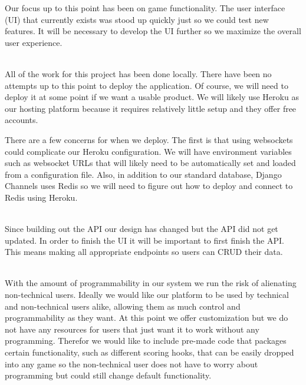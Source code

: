 \documentclass{article}
\begin{document}
    Our focus up to this point has been on game functionality. The user interface (UI) that currently exists was stood up quickly just so we could test new features. It will be necessary to develop the UI further so we maximize the overall user experience.
    \\\\
    \smallskip

    All of the work for this project has been done locally. There have been no attempts up to this point to deploy the application. Of course, we will need to deploy it at some point if we want a usable product. We will likely use Heroku as our hosting platform because it requires relatively little setup and they offer free accounts.
    \smallskip
    
    There are a few concerns for when we deploy. The first is that using websockets could complicate our Heroku configuration. We will have environment variables such as websocket URLs that will likely need to be automatically set and loaded from a configuration file. Also, in addition to our standard database, Django Channels uses Redis so we will need to figure out how to deploy and connect to Redis using Heroku. 
    \\\\
    \smallskip
    
    Since building out the API our design has changed but the API did not get updated. In order to finish the UI it will be important to first finish the API. This means making all appropriate endpoints so users can CRUD their data. 
    \\\\
    \smallskip
    
    With the amount of programmability in our system we run the risk of alienating non-technical users. Ideally we would like our platform to be used by technical and non-technical users alike, allowing them as much control and programmability as they want. At this point we offer customization but we do not have any resources for users that just want it to work without any programming. Therefor we would like to include pre-made code that packages certain functionality, such as different scoring hooks, that can be easily dropped into any game so the non-technical user does not have to worry about programming but could still change default functionality.
    \\\\
    \smallskip
    
\end{document}
